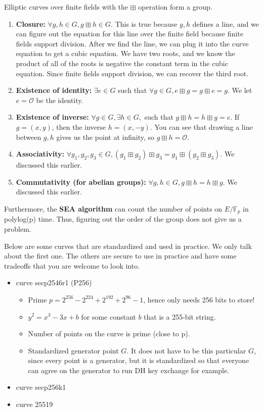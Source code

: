 \begin{proposition}
    Elliptic curves over finite fields with the $\boxplus$ operation form a group.
    \begin{enumerate}
        \item \textbf{Closure:} $\forall g, h \in G, g\boxplus h \in G$. This is true because $g,h$ defines a line, and we can figure out the equation for this line over the finite field because finite fields support division. After we find the line, we can plug it into the curve equation to get a cubic equation. We have two roots, and we know the product of all of the roots is negative the constant term in the cubic equation. Since finite fields support division, we can recover the third root.
        \item \textbf{Existence of identity:} $\exists e \in G $ such that $\forall g\in G, e \boxplus g = g \boxplus e = g$. We let $e = \mathcal{O}$ be the identity. 
        \item \textbf{Existence of inverse:} $\forall g \in G, \exists h \in G, $ such that $g \boxplus h = h \boxplus g = e$. If $g = (x,y)$, then the inverse $h = (x, -y)$. You can see that drawing a line between $g,h$ gives us the point at infinity, so $g \boxplus h = \mathcal{O}$.
        \item \textbf{Associativity:} $\forall g_1, g_2, g_3 \in G, (g_1 \boxplus g_2) \boxplus g_3 = g_1 \boxplus (g_2 \boxplus g_3)$. We discussed this earlier.
        \item \textbf{Commutativity (for abelian groups):} $\forall g,h \in G, g\boxplus h = h \boxplus g.$ We discussed this earlier.
    \end{enumerate}
\end{proposition}

Furthermore, the \textbf{SEA algorithm} can count the number of points on $E / \mathbb{F}_p$ in polylog(p) time. Thus, figuring out the order of the group does not give us a problem.

Below are some curves that are standardized and used in practice. We only talk about the first one. The others are secure to use in practice and have some tradeoffs that you are welcome to look into.

\begin{itemize}
    \item curve secp2546r1 (P256) \begin{itemize}
        \item Prime $p = 2^{256} - 2^{224} + 2^{192} + 2^{96} -1$, hence only needs 256 bits to store!
        \item $y^2 = x^3 -3x + b$ for some constant $b$ that is a 255-bit string.
        \item Number of points on the curve is prime (close to p).
        \item Standardized generator point $G$. It does not have to be this particular $G$, since every point is a generator, but it is standardized so that everyone can agree on the generator to run DH key exchange for example.
    \end{itemize}
    \item curve secp256k1
    \item curve 25519
\end{itemize}


